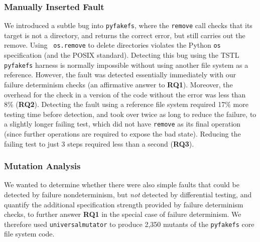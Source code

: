 {\subsubsection{Manually Inserted Fault}

We introduced a subtle bug into {\tt pyfakefs}, where the {\tt remove}
call checks that its target is not a directory, and returns the
correct error, but still carries out the remove.  Using {\tt
  os.remove} to delete directories violates the Python {\tt os}
specification (and the POSIX standard).  Detecting this bug using the TSTL
{\tt pyfakefs} harness is normally impossible without using another
file system as a reference.  However, the fault was detected  essentially
immediately with our failure determinism checks (an affirmative answer
to {\bf RQ1}).  Moreover, the overhead for the check in a
version of the code without the error was
less than 8\%  ({\bf RQ2}).  Detecting the fault using a reference file system 
required 17\% more testing time before detection, and took over twice as
long to reduce the failure, to a
slightly longer failing test, which did not have {\tt remove} as its
final operation (since further operations are required to 
expose the bad state).
Reducing
the failing test to just 3 steps required less than a second ({\bf RQ3}).

\subsubsection{Mutation Analysis}

We wanted to determine whether there were also simple faults that
could be detected by failure nondeterminism, but \emph{not} detected
by differential testing, and quantify the additional specification
strength provided by failure determinism checks, to further answer
{\bf RQ1} in the special case of failure determinism.  We therefore used
{\tt universalmutator} \cite{RegExpMut} to produce 2,350 mutants of
the {\tt pyfakefs} core file system code.   %

}
